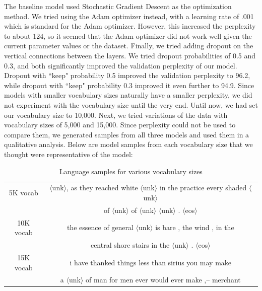 \documentclass[a4paper]{article}
\begin{document}
\newline
\newline
The baseline model used Stochastic Gradient Descent as the optimization method. We tried using the Adam optimizer instead, with a learning rate of .001 which is standard for the Adam optimizer. However, this increased the perplexity to about 124, so it seemed that the Adam optimizer did not work well given the current parameter values or the dataset. Finally, we tried adding dropout on the vertical connections between the layers. We tried dropout probabilities of 0.5 and 0.3, and both significantly improved the validation perplexity of our model. Dropout with ``keep" probability 0.5 improved the validation perplexity to 96.2, while dropout with ``keep" probability 0.3 improved it even further to 94.9.
\newline
\newline
Since models with smaller vocabulary sizes naturally have a smaller perplexity, we did not experiment with the vocabulary size until the very end. Until now, we had set our vocabulary size to 10,000. Next, we tried variations of the data with vocabulary sizes of 5,000 and 15,000. Since perplexity could not be used to compare them, we generated samples from all three models and used them in a qualitative analysis.
Below are model samples from each vocabulary size that we thought were representative of the model:

\begin{table}[h]
\centering
\begin{tabular}{|c | c|} 
 \hline
 5K vocab & $\langle$unk$\rangle$, as they reached white $\langle$unk$\rangle$ in
the practice every shaded $\langle$unk$\rangle$  \\ & of $\langle$unk$\rangle$ of $\langle$unk$\rangle$ $\langle$unk$\rangle$ . $\langle$eos$\rangle$ \\ \hline
10K vocab & the
essence of general $\langle$unk$\rangle$ is bare , the wind , in the \\ & central shore stairs in the $\langle$unk$\rangle$ . $\langle$eos$\rangle$ \\ \hline
15K vocab & i have thanked things less than sirius you may make \\ & a $\langle$unk$\rangle$ of man for men ever would ever
make ,-- merchant \\ \hline
\end{tabular}
\caption{Language samples for various vocabulary sizes}
\label{table:1}
\end{table}
\end{document}
